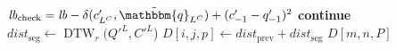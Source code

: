 \begin{algorithm*}[t]
\begin{algorithmic}[1]
{                    \State $\mathit{lb}_\mathrm{check} = \mathit{lb} - \delta(c'_{L^C}, \tilde{\mathbbm{q}}_{L^C}) + (c'_{-1} - q'_{-1})^2$ 
                        \State \textbf{continue}
                    \EndIf
                    \color{black}
                    \State $\mathit{dist}_{\mathrm{seg}} \gets \operatorname{DTW}_r(Q'^L, C'^L$)                    
                        \State $D[i,j,p] \gets \mathit{dist}_{\mathrm{prev}}+\mathit{dist}_{\mathrm{seg}}$ 
                    \EndIf
                \EndFor
            \EndFor
        \EndFor}
    \EndFor
\EndFor
\State \Return $D[m, n, P]$
\end{algorithmic}
\end{algorithm*}
